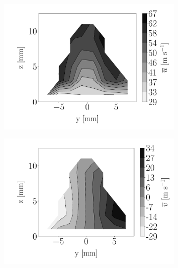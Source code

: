 \begin{figure}[h!]
\begin{subfigure}[b]{0.3\textwidth}
	\centering
   \includegraphics[scale=\scaleSLIJICF]{./part2_developments/figures_ch5_resolved_JICF/injectors_SLI/uG75_dx10_x10_ux_mean_map}
\end{subfigure}
   \hspace{0.17in}
\begin{subfigure}[b]{0.3\textwidth}
	\centering
   \includegraphics[scale=\scaleSLIJICF]{./part2_developments/figures_ch5_resolved_JICF/injectors_SLI/uG75_dx10_x10_uy_mean_map}
\end{subfigure}
   \hspace{0.17in}

\end{figure}

